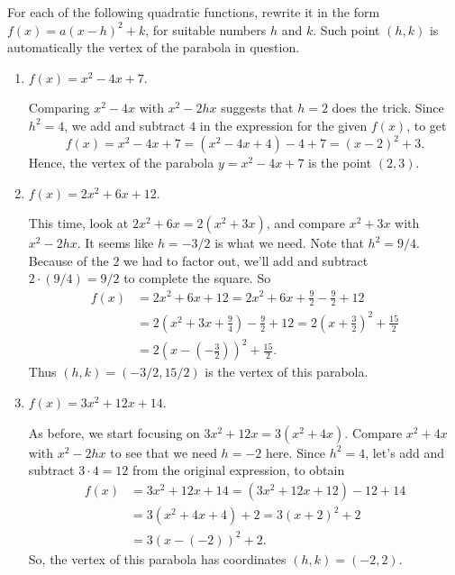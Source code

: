 \documentclass{ximera}
\begin{document}
\begin{example}
  For each of the following quadratic functions, rewrite it in the form $f(x) = a(x-h)^2+k$, for suitable numbers $h$ and $k$. Such point $(h,k)$ is automatically the vertex of the parabola in question.
  \begin{enumerate}[label=\alph*.]
  \item $f(x) = x^2-4x+7$. \\[.5em]
    \begin{explanation}
      Comparing $x^2-4x$ with $x^2-2hx$ suggests that $h=2$ does the trick. Since $h^2=4$, we add and subtract $4$ in the expression for the given $f(x)$, to get $$  f(x) = x^2-4x+7 =(x^2-4x+4)-4+7 = (x-2)^2+3.   $$Hence, the vertex of the parabola $y=x^2-4x+7$ is the point $(2,3)$.
    \end{explanation}
  \item $f(x) = 2x^2 + 6x+12$. \\[.5em]
    \begin{explanation}
      This time, look at $2x^2+6x = 2(x^2+3x)$, and compare $x^2+3x$ with $x^2-2hx$. It seems like $h=-3/2$ is what we need. Note that $h^2 = 9/4$. Because of the $2$ we had to factor out, we'll add and subtract $2 \cdot (9/4) = 9/2$ to complete the square. So \begin{align*}f(x) &= 2x^2+6x+12 = 2x^2+6x + \frac{9}{2} - \frac{9}{2} + 12 \\ &= 2\left(x^2+3x+\frac{9}{4}\right) -\frac{9}{2} + 12 = 2\left(x+\frac{3}{2}\right)^2 + \frac{15}{2}\\ &=  2\left(x-\left(-\frac{3}{2}\right)\right)^2 + \frac{15}{2}.\end{align*}Thus $(h,k) = (-3/2, 15/2)$ is the vertex of this parabola.
    \end{explanation}
  \item $f(x) = 3x^2 + 12x + 14$. \\[.5em]
    \begin{explanation}
      As before, we start focusing on $3x^2+12x = 3(x^2+4x)$. Compare $x^2+4x$ with $x^2-2hx$ to see that we need $h = -2$ here. Since $h^2 = 4$, let's add and subtract $3 \cdot 4 = 12$ from the original expression, to obtain
      \begin{align*}
        f(x) &= 3x^2+12x+14 = (3x^2+12x+12)-12+14 \\ &= 3(x^2+4x+4) + 2 = 3(x+2)^2+2 \\ &= 3(x-(-2))^2+2.
      \end{align*}
So, the vertex of this parabola has coordinates $(h,k) = (-2,2)$.
    \end{explanation}
  \end{enumerate}
\end{example}
\end{document}
